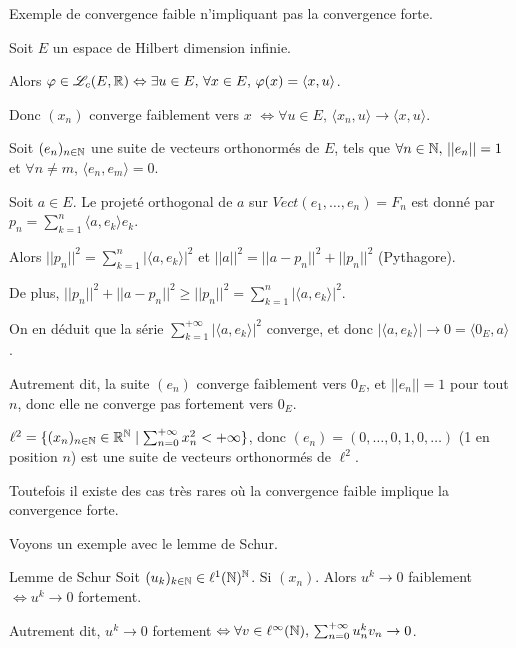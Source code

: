 \begin{exemple}
    Exemple de convergence faible n'impliquant pas la convergence forte.

    Soit $E$ un espace de Hilbert dimension infinie. 
    
    Alors $\varphi \in \mathscr L_c(E, \mathbb{R}) \Leftrightarrow \exists u \in E, \, \forall x \in E, \, \varphi(x) = \langle x, u \rangle$.

    Donc $(x_n)$ converge faiblement vers $x$ $\Leftrightarrow \forall u \in E, \, \langle x_n, u \rangle \to \langle x, u \rangle$.
    
    Soit $(e_n)_{n\in\mathbb{N}}$ une suite de vecteurs orthonormés de $E$, tels que 
    $\forall n \in \mathbb{N}, \, ||e_n|| = 1$ et $\forall n \neq m, \, \langle e_n, e_m \rangle = 0$.

    Soit $a \in E$. Le projeté orthogonal de $a$ sur $Vect(e_1, \ldots, e_n) = F_n$ est donné 
    par $p_n = \sum_{k = 1}^n \langle a, e_k \rangle e_k$.

    Alors $||p_n||^2 = \sum_{k = 1}^n |\langle a, e_k \rangle|^2$ et 
    $||a||^2 = ||a - p_n||^2 + ||p_n||^2$ (Pythagore).

    De plus, $||p_n||^2 + ||a - p_n||^2 \geqslant ||p_n||^2 = \sum_{k = 1}^n |\langle a, e_k \rangle|^2$.

    On en déduit que la série $\sum_{k = 1}^{+\infty} |\langle a, e_k \rangle|^2$ converge, et 
    donc $|\langle a, e_k \rangle| \to 0 = \langle 0_E, a \rangle$.

    Autrement dit, la suite $(e_n)$ converge faiblement vers $0_E$, et $||e_n|| = 1$ pour tout $n$, donc elle ne converge pas fortement vers $0_E$.

    \lvspace 

    $\ell^2 = \{(x_n)_{n\in\mathbb{N}} \in \mathbb{R}^{\mathbb{N}} \mid \sum_{n = 0}^{+\infty} x_n^2 < +\infty \}$, 
    donc $(e_n) = (0, \ldots, 0, 1, 0, \ldots)$ (1 en position $n$) est une suite de vecteurs orthonormés de $\ell^2$.

\end{exemple}

Toutefois il existe des cas très rares où la convergence faible implique la convergence forte.

Voyons un exemple avec le lemme de Schur. 

\begin{theoreme}{Lemme de Schur}{}
    Soit $(u_k)_{k\in\mathbb{N}} \in \ell^1(\mathbb{N})^{\mathbb{N}}$. Si $(x_n)$. Alors 
    $u^k \to 0$ faiblement $\Leftrightarrow u^k \to 0$ fortement.

    Autrement dit, $u^k \to 0$ fortement $\Leftrightarrow \forall v \in \ell^\infty(\mathbb{N}), \, \sum_{n = 0}^{+\infty} u_n^k v_n \to 0$.
\end{theoreme}

